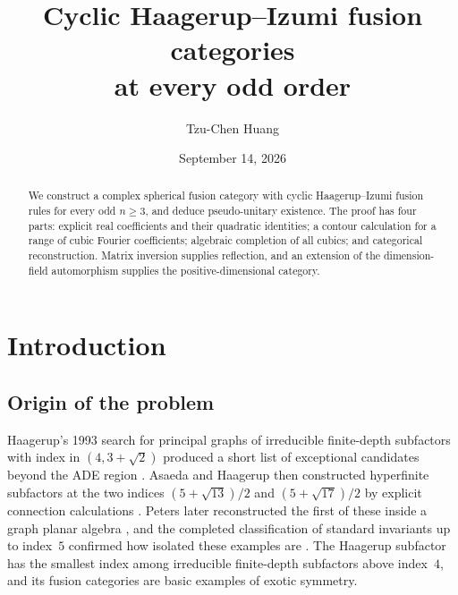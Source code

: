 \documentclass[11pt]{article}
\title{Cyclic Haagerup--Izumi fusion categories\\at every odd order}
\author{Tzu-Chen Huang}
\date{September 14, 2026}
\numberwithin{equation}{section}
\theoremstyle{definition}
\theoremstyle{remark}
\begin{document}
\maketitle
\begin{abstract}
We construct a complex spherical fusion category with cyclic
Haagerup--Izumi fusion rules for every odd $n\ge3$, and deduce
pseudo-unitary existence. The proof has four parts: explicit real
coefficients and their quadratic identities; a contour calculation
for a range of cubic Fourier coefficients; algebraic completion of
all cubics; and categorical reconstruction. Matrix inversion supplies
reflection, and an extension of the dimension-field automorphism
supplies the positive-dimensional category.
\end{abstract}


\begingroup
\small
\makeatletter
\renewcommand*\l@section{\@dottedtocline{1}{0pt}{1.8em}}
\makeatother
\tableofcontents
\endgroup
\clearpage

\section{Introduction}
\label{sec:introduction}

\subsection*{Origin of the problem}

Haagerup's 1993 search for principal graphs of irreducible finite-depth
subfactors with index in $(4,3+\sqrt2)$ produced a short list of
exceptional candidates beyond the ADE region \cite{Haagerup}. Asaeda and
Haagerup then constructed hyperfinite subfactors at the two indices
$(5+\sqrt{13})/2$ and $(5+\sqrt{17})/2$ by explicit connection
calculations \cite{AH}. Peters later reconstructed the first of these
inside a graph planar algebra \cite{Peters}, and the completed
classification of standard invariants up to index~$5$ confirmed how
isolated these examples are \cite{JMS}. The Haagerup subfactor has the
smallest index among irreducible finite-depth subfactors above index~$4$,
and its fusion categories are basic examples of exotic symmetry.
\end{document}
